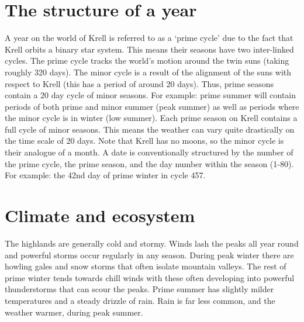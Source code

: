 \documentclass[a4paper,11pt,oneside]{book}
\begin{document}
\section{The structure of a year}
A year on the world of Krell is referred to as a `prime cycle' due to the fact that Krell orbits a binary star system. This means their seasons have two inter-linked cycles. The prime cycle tracks the world's motion around the twin suns (taking roughly 320 days). The minor cycle is a result of the alignment of the suns with respect to Krell (this has a period of around 20 days). Thus, prime seasons contain a 20 day cycle of minor seasons. For example: prime summer will contain periods of both prime and minor summer (peak summer) as well as periods where the minor cycle is in winter (low summer). Each prime season on Krell contains a full cycle of minor seasons. This means the weather can vary quite drastically on the time scale of 20 days. Note that Krell has no moons, so the minor cycle is their analogue of a month. A date is conventionally structured by the number of the prime cycle, the prime season, and the day number within the season (1-80). For example: the 42nd day of prime winter in cycle 457.

\section{Climate and ecosystem}
The highlands are generally cold and stormy. Winds lash the peaks all year round and powerful storms occur regularly in any season. During peak winter there are howling gales and snow storms that often isolate mountain valleys. The rest of prime winter tends towards chill winds with these often developing into powerful thunderstorms that can scour the peaks. Prime summer has slightly milder temperatures and a steady drizzle of rain. Rain is far less common, and the weather warmer, during peak summer. 
\end{document}
